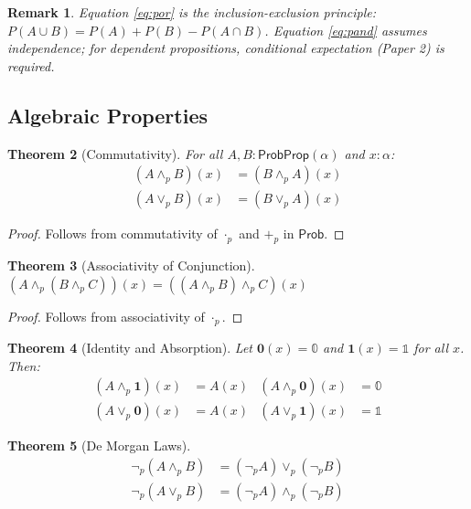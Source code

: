 \documentclass[11pt,a4paper]{article}
\newtheorem{theorem}{Theorem}[section]
\newtheorem{remark}[theorem]{Remark}
\newcommand{\Prob}{\mathsf{Prob}}
\newcommand{\ProbProp}{\mathsf{ProbProp}}
\newcommand{\pand}{\wedge_p}
\newcommand{\por}{\vee_p}
\newcommand{\pnot}{\neg_p}
\newcommand{\pzero}{\mathbb{0}}
\newcommand{\pone}{\mathbb{1}}
\newcommand{\padd}{+_p}
\newcommand{\pmul}{\cdot_p}
\begin{document}
\begin{remark}
Equation \eqref{eq:por} is the inclusion-exclusion principle: $P(A \cup B) = P(A) + P(B) - P(A \cap B)$. Equation \eqref{eq:pand} assumes independence; for dependent propositions, conditional expectation (Paper 2) is required.
\end{remark}

\subsection{Algebraic Properties}

\begin{theorem}[Commutativity]
For all $A, B : \ProbProp(\alpha)$ and $x : \alpha$:
\begin{align*}
    (A \pand B)(x) &= (B \pand A)(x) \\
    (A \por B)(x) &= (B \por A)(x)
\end{align*}
\end{theorem}

\begin{proof}
Follows from commutativity of $\pmul$ and $\padd$ in $\Prob$.
\end{proof}

\begin{theorem}[Associativity of Conjunction]
$(A \pand (B \pand C))(x) = ((A \pand B) \pand C)(x)$
\end{theorem}

\begin{proof}
Follows from associativity of $\pmul$.
\end{proof}

\begin{theorem}[Identity and Absorption]
Let $\mathbf{0}(x) = \pzero$ and $\mathbf{1}(x) = \pone$ for all $x$. Then:
\begin{align*}
    (A \pand \mathbf{1})(x) &= A(x) & (A \pand \mathbf{0})(x) &= \pzero \\
    (A \por \mathbf{0})(x) &= A(x) & (A \por \mathbf{1})(x) &= \pone
\end{align*}
\end{theorem}

\begin{theorem}[De Morgan Laws]
\begin{align*}
    \pnot(A \pand B) &= (\pnot A) \por (\pnot B) \\
    \pnot(A \por B) &= (\pnot A) \pand (\pnot B)
\end{align*}
\end{theorem}
\end{document}
